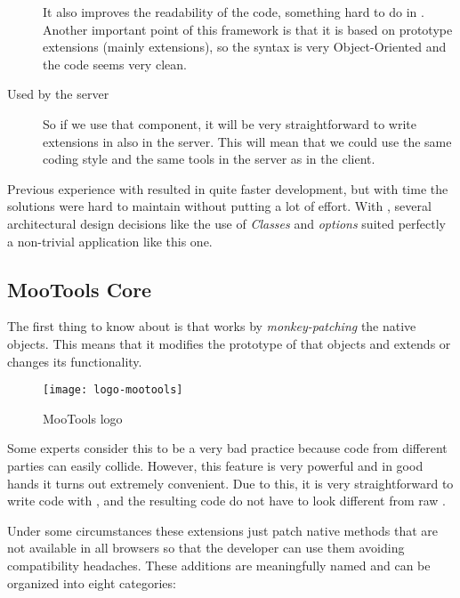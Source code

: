\begin{description}
  It also improves the readability of the code, something hard to do in .
  Another important point of this framework is that it is based on prototype extensions (mainly  extensions), so the syntax is very Object-Oriented and the code seems very clean.

  \item[Used by the \ida{APE} server]
  So if we use that component, it will be very straightforward to write extensions in  also in the server.
  This will mean that we could use the same coding style and the same tools in the server as in the client.

\end{description}

Previous experience with  resulted in quite faster development, but with time the solutions were hard to maintain without putting a lot of effort.
With , several architectural design decisions like the use of \emph{Classes} and \emph{options} suited perfectly a non-trivial application like this one.


\subsection{MooTools Core} %
\label{sub:mootools_core}

The first thing to know about  is that works by \emph{monkey-patching} the native objects.
This means that it modifies the prototype of that objects and extends or changes its functionality.

\begin{wrapfigure}{r}{0.5\textwidth}
  \centering
    \texttt{[image: logo-mootools]}
  \caption{MooTools logo}
  \label{fig:logo-mootools}
\end{wrapfigure}

Some experts consider this to be a very bad practice because code from different parties can easily collide.
However, this  feature is very powerful and in good hands it turns out extremely convenient.
Due to this, it is very straightforward to write code with , and the resulting code do not have to look different from raw .

Under some circumstances these extensions just patch native methods that are not available in all browsers so that the developer can use them avoiding compatibility headaches.
These additions are meaningfully named and can be organized into eight categories:

